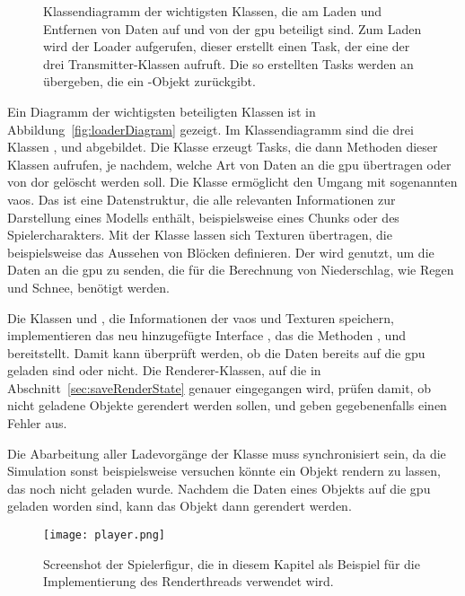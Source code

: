 \begin{figure}
	\centering
	
	\caption{Klassendiagramm der wichtigsten Klassen, die am Laden und Entfernen von Daten auf und von der \ac{gpu} beteiligt sind. Zum Laden wird der Loader aufgerufen, dieser erstellt einen Task, der eine der drei Transmitter-Klassen aufruft. Die so erstellten Tasks werden an  übergeben, die ein -Objekt zurückgibt.}\label{fig:loaderDiagram}
\end{figure}
Ein Diagramm der wichtigsten beteiligten Klassen ist in Abbildung~\vref{fig:loaderDiagram} gezeigt. Im Klassendiagramm sind die drei Klassen ,  und  abgebildet. Die Klasse  erzeugt Tasks, die dann Methoden dieser Klassen aufrufen, je nachdem, welche Art von Daten an die \ac{gpu} übertragen oder von dor gelöscht werden soll. Die Klasse  ermöglicht den Umgang mit sogenannten \acp{vao}. Das ist eine Datenstruktur, die alle relevanten Informationen zur Darstellung eines Modells enthält, beispielsweise eines Chunks oder des Spielercharakters. Mit der Klasse  lassen sich Texturen übertragen, die beispielsweise das Aussehen von Blöcken definieren. Der  wird genutzt, um die Daten an die \ac{gpu} zu senden, die für die Berechnung von Niederschlag, wie Regen und Schnee, benötigt werden.

Die Klassen  und , die Informationen der \acp{vao} und Texturen speichern, implementieren das neu hinzugefügte Interface , das die Methoden 	, 
 und 
 bereitstellt. Damit kann überprüft werden, ob die Daten bereits auf die \ac{gpu} geladen sind oder nicht. Die Renderer-Klassen, auf die in Abschnitt~\ref{sec:saveRenderState} genauer eingegangen wird, prüfen damit, ob nicht geladene Objekte gerendert werden sollen, und geben gegebenenfalls einen Fehler aus.

Die Abarbeitung aller Ladevorgänge der Klasse  muss synchronisiert sein, da die Simulation sonst beispielsweise versuchen könnte ein Objekt rendern zu lassen, das noch nicht geladen wurde. Nachdem die Daten eines Objekts auf die \ac{gpu} geladen worden sind, kann das Objekt dann gerendert werden.

\begin{figure}
	\centering
	\texttt{[image: player.png]}
	\caption{Screenshot der Spielerfigur, die in diesem Kapitel als Beispiel für die Implementierung des Renderthreads verwendet wird.}\label{fig:player}
\end{figure}

